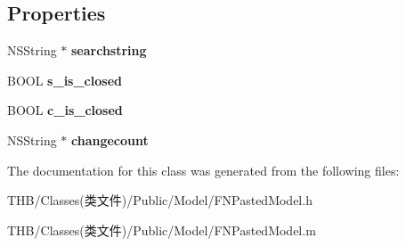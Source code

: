 \subsection*{Properties}
\begin{DoxyCompactItemize}
\item 
\mbox{\label{interface_f_n_pasted_model_abdd19ec6f7a4968f28004232e3194ed1}} 
N\+S\+String $\ast$ {\bfseries searchstring}
\item 
\mbox{\label{interface_f_n_pasted_model_aecb0cc4f580a8268a049030ad472ebd8}} 
B\+O\+OL {\bfseries s\+\_\+is\+\_\+closed}
\item 
\mbox{\label{interface_f_n_pasted_model_a100c7e61bf109a3790a1d85e72d004fa}} 
B\+O\+OL {\bfseries c\+\_\+is\+\_\+closed}
\item 
\mbox{\label{interface_f_n_pasted_model_a425d80d8af292d6deb4c68e5dc498b35}} 
N\+S\+String $\ast$ {\bfseries changecount}
\end{DoxyCompactItemize}


The documentation for this class was generated from the following files\+:\begin{DoxyCompactItemize}
\item 
T\+H\+B/\+Classes(类文件)/\+Public/\+Model/F\+N\+Pasted\+Model.\+h\item 
T\+H\+B/\+Classes(类文件)/\+Public/\+Model/F\+N\+Pasted\+Model.\+m\end{DoxyCompactItemize}
